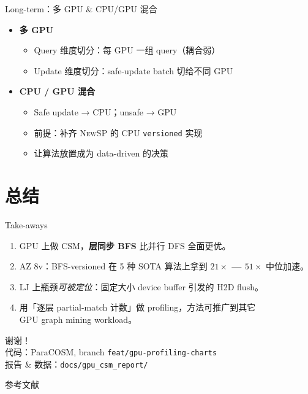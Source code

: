 \documentclass[aspectratio=169,10pt]{beamer}
\begin{document}
\begin{frame}{Long-term：多 GPU \& CPU/GPU 混合}
  \begin{itemize}
    \item \textbf{多 GPU}
    \begin{itemize}
      \item Query 维度切分：每 GPU 一组 query（耦合弱）
      \item Update 维度切分：safe-update batch 切给不同 GPU
    \end{itemize}
    \item \textbf{CPU / GPU 混合}
    \begin{itemize}
      \item Safe update → CPU；unsafe → GPU
      \item 前提：补齐 \textsc{NewSP} 的 CPU \texttt{versioned} 实现
      \item 让算法放置成为 data-driven 的决策
    \end{itemize}
  \end{itemize}
\end{frame}

\section{总结}
\begin{frame}{Take-aways}
  \begin{enumerate}
    \item GPU 上做 CSM，\textbf{层同步 BFS} 比并行 DFS 全面更优。
    \item AZ 8v：BFS-versioned 在 5 种 SOTA 算法上拿到 \textbf{$21\times$ — $51\times$} 中位加速。
    \item LJ 上瓶颈\emph{可被定位}：固定大小 device buffer 引发的 H2D flush。
    \item 用「逐层 partial-match 计数」做 profiling，方法可推广到其它\\GPU graph mining workload。
  \end{enumerate}
  \vfill
  \centering
  \alert{\Large 谢谢！}\\[6pt]
  \footnotesize
  代码：ParaCOSM, branch \texttt{feat/gpu-profiling-charts}\\
  报告 \& 数据：\texttt{docs/gpu\_csm\_report/}
\end{frame}

\begin{frame}[allowframebreaks]{参考文献}
  \tiny
  
  
\end{frame}
\end{document}
